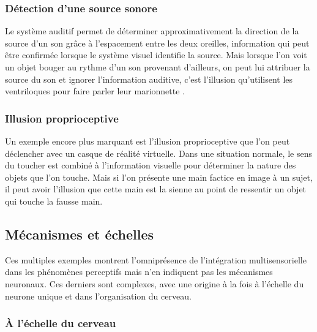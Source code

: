 \subsubsection{Détection d'une source sonore}

Le système auditif permet de déterminer approximativement la direction de la source d'un son grâce à l'espacement entre les deux oreilles, information qui peut être confirmée lorsque le système visuel identifie la source. Mais lorsque l'on voit un objet bouger au rythme d'un son provenant d'ailleurs, on peut lui attribuer la source du son et ignorer l'information auditive, c'est l'illusion qu'utilisent les ventriloques pour faire parler leur marionnette \cite{bonath_neural_2007}.

\subsubsection{Illusion proprioceptive}

Un exemple encore plus marquant est l'illusion proprioceptive que l'on peut déclencher avec un casque de réalité virtuelle. Dans une situation normale, le sens du toucher est combiné à l'information visuelle pour déterminer la nature des objets que l'on touche. Mais si l'on présente une main factice en image à un sujet, il peut avoir l'illusion que cette main est la sienne au point de ressentir un objet qui touche la fausse main.

\subsection{Mécanismes et échelles}

Ces multiples exemples montrent l'omniprésence de l'intégration multisensorielle dans les phénomènes perceptifs mais n'en indiquent pas les mécanismes neuronaux. Ces derniers sont complexes, avec une origine à la fois à l'échelle du neurone unique et dans l'organisation du cerveau.

\subsubsection{À l'échelle du cerveau}

